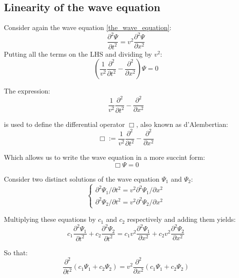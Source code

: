 \documentclass[12pt]{article}
\begin{document}
\subsection{Linearity of the wave equation}
Consider again the wave equation \eqref{the_wave_equation}:
\begin{equation*}
\frac{\partial^2 \Psi}{\partial t^2} = 
v^2 \frac{\partial^2 \Psi}{\partial x^2}
\end{equation*}
Putting all the terms on the LHS and dividing by $v^2$:
\begin{equation*}
\left( \frac{1}{v^2} \frac{\partial^2}{\partial t^2} - 
\frac{\partial^2}{\partial x^2} \right) \Psi = 0 
\end{equation*}

The expression:
\begin{equation*}
\frac{1}{v^2} \frac{\partial^2}{\partial t^2} - 
\frac{\partial^2}{\partial x^2}
\end{equation*}

is used to define the differential operator $\Box$, also known as d'Alembertian:
\begin{equation*}
\Box :=
\frac{1}{v^2} \frac{\partial^2}{\partial t^2} - 
\frac{\partial^2}{\partial x^2}
\end{equation*}

Which allows us to write the wave equation in a more succint form:
\begin{equation*}
\Box \Psi = 0
\end{equation*}

Consider two distinct solutions of the wave equation $\Psi_1$ and $\Psi_2$:
\begin{equation*}
\begin{cases}
\partial^2 \Psi_1 / \partial t^2 = 
v^2 \partial^2 \Psi_1 / \partial x^2 \\
\partial^2 \Psi_2 / \partial t^2 = 
v^2 \partial^2 \Psi_2 / \partial x^2
\end{cases}
\end{equation*}


Multiplying these equations by $c_1$ and $c_2$ respectively and adding them yields:
\begin{equation*}
c_1 \frac{\partial^2 \Psi_1 }{\partial t^2} +
c_2 \frac{\partial^2 \Psi_2 }{\partial t^2}
=
c_1 v^2 \frac{\partial^2 \Psi_1}{\partial x^2} + 
c_2 v^2 \frac{\partial^2 \Psi_2}{\partial x^2}
\end{equation*}

So that:
\begin{equation*}
\frac{\partial^2}{\partial t^2} 
\left(
c_1 \Psi_1 + c_2 \Psi_2
\right)
=
v^2 \frac{\partial^2}{\partial x^2}
\left(
c_1 \Psi_1 + c_2 \Psi_2
\right)
\end{equation*}
\end{document}
